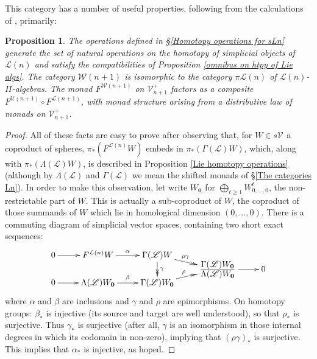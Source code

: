 \documentclass[11pt]{amsart} \renewcommand{\baselinestretch}{1.2}
\theoremstyle{plain}
\newtheorem{prop}[thm]{Proposition}
\numberwithin{equation}{section} %
\theoremstyle{plain}
\newtheorem{prop}[thm]{Proposition}
\numberwithin{equation}{chapter} %
\newcommand{\scrL}{\mathscr{L}}
\newcommand{\calU}{\mathcal{U}}
\newcommand{\calL}{\mathcal{L}}
\newcommand{\calV}{\mathcal{V}}
\newcommand{\calw}{\mathcal{W}}
\newcommand{\LieOperad}{{\scrL}}
\newcommand{\vect}[2]{\calV^{#1}_{#2}}
\newcommand{\PA}[1]{\pi#1}
\begin{document}
\begin{homotopy operations for PRLs}
This category has a number of useful properties, following from the calculations of \cite{6Author.pdf}, primarily:
\begin{prop}
\label{prop on Wnplus1 being the pialgs for Wn}
The operations defined in \S\ref{Homotopy operations for sLn} generate the set of natural operations on the homotopy of simplicial objects of $\calL(n)$ and satisfy the compatibilities of Proposition \ref{omnibus on htpy of Lie algs}. The category $\calw(n+1)$ is isomorphic to the category $\PA{\calL(n)}$ of $\calL(n)$-$\Pi$-algebras. 
The monad $F^{\calw(n+1)}$ on $\vect{+}{n+1}$ factors as a composite $F^{\calU(n+1)}\circ F^{\calL(n+1)}$, with monad structure arising from a distributive law \cite{BeckDistLaws} of monads on $\vect{+}{n+1}$.
\end{prop}
\begin{proof}
All of these facts are easy to prove after observing that, for $W\in s\vect{}{}$ a coproduct of spheres, $\pi_*(F^{\calL(n)}W)$ embeds in $\pi_*({\Gamma(\LieOperad)}W)$, which, along with $\pi_*({\Lambda(\LieOperad)}W)$, is described in Proposition \ref{Lie homotopy operations} (although by $\Lambda(\LieOperad)$ and $\Gamma(\LieOperad)$ we mean the shifted monads of \S\ref{The categories Ln}). In order to make this observation, let write $W_\textbf{0}$ for $\bigoplus_{t\geq1}W_{0,\ldots,0}^t$, the non-restrictable part of $W$. This is actually a sub-coproduct of $W$, the coproduct of those summands of $W$ which lie in homological dimension $(0,\ldots,0)$. There is a commuting diagram of simplicial vector spaces, containing two short exact sequences:
\[\xymatrix@R=-2mm{
0
\ar[r]
&%
F^{\calL(n)}W
\ar[r]^{\alpha}
&%
{\Gamma(\LieOperad)}W
\ar@{->>}[dr]^-(.4){\rho\gamma}\ar@{->>}[dd]^-{\gamma}
&%
\\%
&&&\frac{\displaystyle {\Gamma(\LieOperad)}W_\textbf{0}}{\displaystyle {\Lambda(\LieOperad)}W_\textbf{0}}
\ar[r]
&
0
\\
0
\ar[r]
&%
{\Lambda(\LieOperad)}W_\textbf{0}
\ar[r]^{\beta}
&%
{\Gamma(\LieOperad)}W_\textbf{0}
\ar@{->>}[ru]^-(.4){\rho}&%
}\]
where $\alpha$ and $\beta$ are inclusions and $\gamma$ and $\rho$ are epimorphisms.
On homotopy groups: $\beta_*$ is injective (its source and target are well understood), so that $\rho_*$ is surjective. Thus $\gamma_*$ is surjective (after all, $\gamma$ is an isomorphism in those internal degrees in which its codomain in non-zero), implying that $(\rho\gamma)_*$ is surjective. This implies that $\alpha_*$ is injective, as hoped.

\end{proof}
\end{homotopy operations for PRLs}
\end{document}
